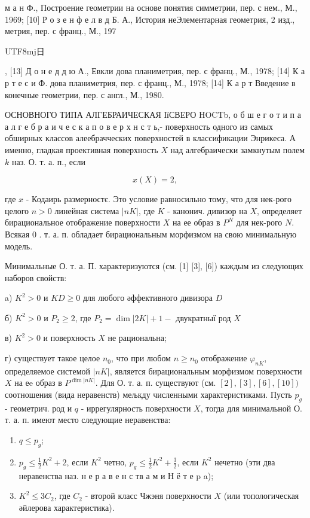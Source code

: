 \documentclass[10pt]{article}
\begin{document}
м а н Ф., Построение геометрии на основе понятия симметрии, пер. с нем., М., 1969; [10] Р о з е н ф е л в д Б. А., История неЭлементарная геометрия, 2 изд., метрия, пер. с франц., М., 197\begin{CJK}{UTF8}{mj}日\end{CJK}, [13] Д о н е д д ю А., Евкли дова планиметрия, пер. с франц., М., 1978; [14] К а р т е с и Ф. дова планиметрия, пер. с франц., М., 1978; [14] К а р т
Введение в конечные геометрии, пер. с англ., М., 1980.

ОСНОВНОГО ТИПА АЛГЕБРАИЧЕСКАЯ ІїСВЕРО HOCTb, о б ш е г о т и п а а л г е б р а и ч е с к а п о в е р х н с т ь,- поверхность одного из самых обширных классов алеебрачческих поверхностей в классификации Энрикеса. А именно, гладкая проективная поверхность $X$ над алгебраически замкнутым полем $k$ наз. О. т. а. п., если

\[
x(X)=2,
\]

где $x$ - Кодаирь размерностє. Это условие равносильно тому, что для нек-рого целого $n>0$ линейная система $|n K|$, где $K$ - канонич. дивизор на $X$, определяет бирациональное отображение поверхности $X$ на ее образ в $P^{N}$ для нек-рого $N$. Всякая 0 . т. а. п. обладает бирациональным морфизмом на свою минимальную модель.

Минимальные О. т. а. П. характеризуются (см. [1] [3], [6]) каждым из следующих наборов свойств:

a) $K^{2}>0$ и $K D \geqslant 0$ для любого әффективного дивизора $D$

б) $K^{2}>0$ и $P_{2} \geqslant 2$, где $P_{2}=\operatorname{dim}|2 K|+1-$ двукратныї род $X$

в) $K^{2}>0$ и поверхность $X$ не рациональна;

г) существует такое целое $n_{0}$, что при любом $n \geqslant n_{0}$ отображение $\varphi_{n K}$, определяемое системой $|n K|$, является бирациональным морфизмом поверхности $X$ на еe образ в $P^{\operatorname{dim}|n K|}$. Для О. т. а. п. существуют (см. $[2],[3],[6],[10])$ соотношения (вида неравенств) мељкду численными характеристиками. Пусть $p_{g}$ - геометрич. род и $q$ - иррегулярность поверхности $X$, тогда для минимальной О. т. а. п. имеют место следующие неравенства:

\begin{enumerate}
  \item $q \leqslant p_{g}$;

  \item $p_{g} \leqslant \frac{1}{2} K^{2}+2$, если $K^{2}$ четно, $p_{g} \leqslant \frac{1}{2} K^{2}+\frac{3}{2}$, если $K^{2}$ нечетно (эти два неравенства наз. н е р а в е н с тв а м и Н ё т е p a);

  \item $K^{2} \leqslant 3 C_{2}$, где $C_{2}$ - второй класс Чжэня поверхности $X$ (или топологическая әйлерова характеристика).

\end{enumerate}
\end{document}
